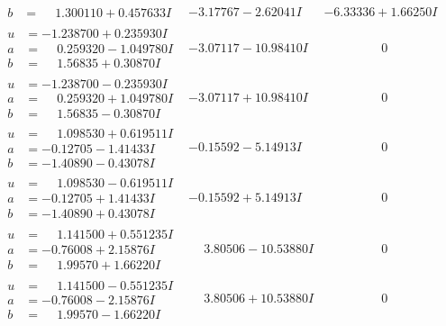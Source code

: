 \documentclass[1p]{elsarticle_modified}
\theoremstyle{definition}
\begin{document}
$$\begin{array}{c|c|c}
\begin{aligned}
b &= \phantom{-}1.300110 + 0.457633 I\end{aligned}
 & -3.17767 - 2.62041 I & -6.33336 + 1.66250 I \\ \hline\begin{aligned}
u &= -1.238700 + 0.235930 I \\
a &= \phantom{-}0.259320 - 1.049780 I \\
b &= \phantom{-}1.56835 + 0.30870 I\end{aligned}
 & -3.07117 - 10.98410 I & \phantom{-0.000000 } 0 \\ \hline\begin{aligned}
u &= -1.238700 - 0.235930 I \\
a &= \phantom{-}0.259320 + 1.049780 I \\
b &= \phantom{-}1.56835 - 0.30870 I\end{aligned}
 & -3.07117 + 10.98410 I & \phantom{-0.000000 } 0 \\ \hline\begin{aligned}
u &= \phantom{-}1.098530 + 0.619511 I \\
a &= -0.12705 - 1.41433 I \\
b &= -1.40890 - 0.43078 I\end{aligned}
 & -0.15592 - 5.14913 I & \phantom{-0.000000 } 0 \\ \hline\begin{aligned}
u &= \phantom{-}1.098530 - 0.619511 I \\
a &= -0.12705 + 1.41433 I \\
b &= -1.40890 + 0.43078 I\end{aligned}
 & -0.15592 + 5.14913 I & \phantom{-0.000000 } 0 \\ \hline\begin{aligned}
u &= \phantom{-}1.141500 + 0.551235 I \\
a &= -0.76008 + 2.15876 I \\
b &= \phantom{-}1.99570 + 1.66220 I\end{aligned}
 & \phantom{-}3.80506 - 10.53880 I & \phantom{-0.000000 } 0 \\ \hline\begin{aligned}
u &= \phantom{-}1.141500 - 0.551235 I \\
a &= -0.76008 - 2.15876 I \\
b &= \phantom{-}1.99570 - 1.66220 I\end{aligned}
 & \phantom{-}3.80506 + 10.53880 I & \phantom{-0.000000 } 0 \\ \hline\begin{aligned}

\end{aligned}
\end{array}$$
\end{document}
